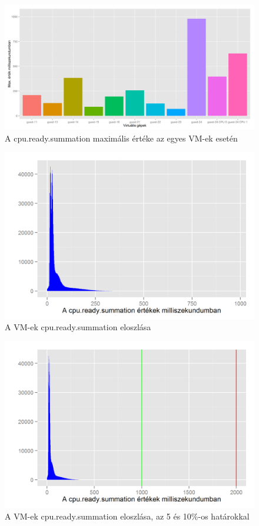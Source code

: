 \documentclass[a4paper,10pt,titlepage]{article}
\begin{document}
\begin{figure}[h!]
\centering
\includegraphics[width=1.00\textwidth]{figures/cpu_ready_summation-max-barchart.png}
\caption{A cpu.ready.summation maximális értéke az egyes VM-ek esetén \label{fig:cpu_ready_summation_max_barchart}}
\end{figure}

\begin{figure}[h!]
\centering
\includegraphics[width=1.00\textwidth]{figures/cpu_ready_summation-histogram.png}
\caption{A VM-ek cpu.ready.summation eloszlása \label{fig:cpu_ready_summation_histogram}}
\end{figure}


\begin{figure}[h!]
\centering
\includegraphics[width=1.00\textwidth]{figures/cpu_ready_summation-histogram-w-b.png}
\caption{A VM-ek cpu.ready.summation eloszlása, az 5 és 10\%-os határokkal \label{fig:cpu_ready_summation_histogram_wb}}
\end{figure}
\end{document}
